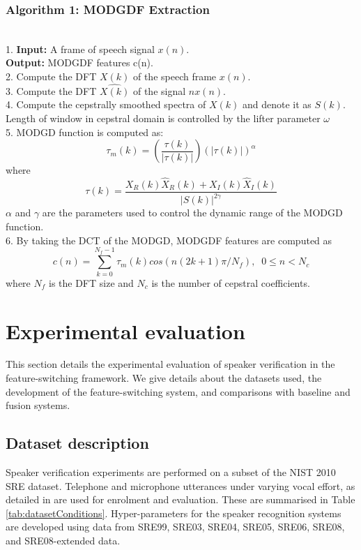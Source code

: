 \documentclass{article}
\begin{document}
\subsubsection*{\bf \small Algorithm 1: MODGDF Extraction} \\
1. {\bf Input:} A frame of speech signal $x(n)$. \\
\hspace*{0.3 cm} {\bf Output:} MODGDF features c(n). \\
2. Compute the DFT $X(k)$ of the speech frame $x(n)$. \\
3. Compute the DFT $\hat{X(k)}$ of the signal $nx(n)$. \\
4. Compute the cepstrally smoothed spectra of $X(k)$ and denote it as $S(k)$. 
\hspace*{0.35 cm} Length of window in cepstral domain is controlled by the lifter parameter $\omega$ \\
5. MODGD function is computed as:
	\begin{equation*}
			\tau_{m}(k)=\left( \frac{\tau (k)}{\left| \tau (k) \right|} \right) \left( \left| \tau(k) \right| \right)^{\alpha}
	\end{equation*}
	\hspace*{0.3 cm} where
	\begin{equation*}
		 \tau(k)=\frac{X_R(k)\hat{X}_R(k)+X_I(k)\hat{X}_I(k)}{\left| S(k)\right|^{2\gamma}}
	\end{equation*}
	 	\hspace*{0.3 cm} $\alpha$ and $\gamma$ are the parameters used to control the dynamic range of the MODGD function. \\
6. By taking the DCT of the MODGD, MODGDF features are computed as 
	\begin{equation*}
	c(n)=\sum_{k=0}^{N_f-1}\tau_m(k)cos(n(2k+1)\pi/N_f), \;\; 0\leq n < N_c
	\end{equation*}	
	where $N_f$	  is the DFT size and $N_c$ is the number of cepstral coefficients.


\section{Experimental evaluation}
\label{sec:expts}
This section details the experimental evaluation of speaker verification in the
feature-switching framework. We give details about the datasets used, the
development of the feature-switching system, and comparisons with baseline and
fusion systems.

\subsection{Dataset description}
\label{sec:dB}
Speaker verification experiments are performed on a subset of
the NIST 2010 SRE dataset. Telephone and microphone utterances under varying vocal effort, as detailed in \cite{nist2010SRE}
are used for enrolment and evaluation. These are summarised in Table \ref{tab:datasetConditions}. Hyper-parameters for the speaker recognition systems are developed using data from SRE99, SRE03, SRE04, SRE05, SRE06, SRE08, and SRE08-extended data.
\end{document}
